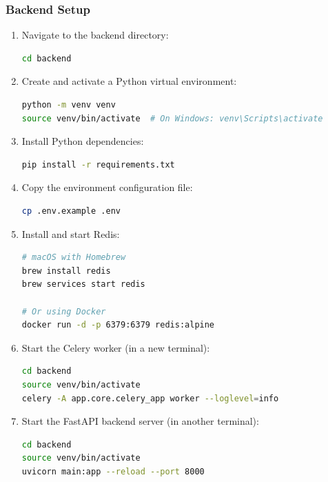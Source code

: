 \subsubsection{Backend Setup}

\begin{enumerate}
    \item Navigate to the backend directory:
\begin{lstlisting}[language=bash, caption={Navigate to backend}]
cd backend
\end{lstlisting}

    \item Create and activate a Python virtual environment:
\begin{lstlisting}[language=bash, caption={Create virtual environment}]
python -m venv venv
source venv/bin/activate  # On Windows: venv\Scripts\activate
\end{lstlisting}

    \item Install Python dependencies:
\begin{lstlisting}[language=bash, caption={Install Python dependencies}]
pip install -r requirements.txt
\end{lstlisting}

    \item Copy the environment configuration file:
\begin{lstlisting}[language=bash, caption={Copy environment file}]
cp .env.example .env
\end{lstlisting}

    \item Install and start Redis:
\begin{lstlisting}[language=bash, caption={Start Redis (macOS with Homebrew)}]
# macOS with Homebrew
brew install redis
brew services start redis

# Or using Docker
docker run -d -p 6379:6379 redis:alpine
\end{lstlisting}

    \item Start the Celery worker (in a new terminal):
\begin{lstlisting}[language=bash, caption={Start Celery worker}]
cd backend
source venv/bin/activate
celery -A app.core.celery_app worker --loglevel=info
\end{lstlisting}

    \item Start the FastAPI backend server (in another terminal):
\begin{lstlisting}[language=bash, caption={Start FastAPI server}]
cd backend
source venv/bin/activate
uvicorn main:app --reload --port 8000
\end{lstlisting}
\end{enumerate}

